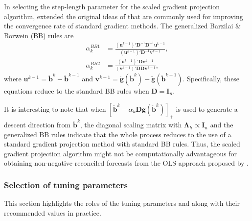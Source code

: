 \documentclass[11pt]{article}
\newcommand{\0}{\phantom{0}}
\begin{document}
In selecting the step-length parameter for the scaled gradient projection algorithm, \citet{Bonettini2009} extended the original ideas of \citet{Barzilai1988} that are commonly used for improving the convergence rate of standard gradient methods. The generalized Barzilai \& Borwein (BB) rules are
\begin{align*}
\alpha_{k}^{BB1} & = \frac{(\bm{u}^{k-1})'\bm{D}^{-1} \bm{D}^{-1} \bm{u}^{k-1}}{(\bm{u}^{k-1})'\bm{D}^{-1}\bm{v}^{k-1}},\\
\alpha_{k}^{BB2} & = \frac{(\bm{u}^{k-1})'\bm{D}\bm{v}^{k-1}}{(\bm{v}^{k-1})'\bm{D}\bm{D}\bm{v}^{k-1}},
\end{align*}
where $\bm{u}^{k-1} = \ddot{\bm{b}}^{k} - \ddot{\bm{b}}^{k-1}$ and $\bm{v}^{k-1} = \ddot{\bm{g}}(\ddot{\bm{b}}^{k}) - \ddot{\bm{g}}(\ddot{\bm{b}}^{k-1})$. Specifically, these equations reduce to the standard BB rules when $\bm{D} = \bm{I}_{n}$.

It is interesting to note that when $[\ddot{\bm{b}}^{k} - \alpha_{k} \bm{D} \ddot{\bm{g}}(\ddot{\bm{b}}^{k})]_{+}$ is used to generate a descent direction from $\ddot{\bm{b}}^{k}$, the diagonal scaling matrix with $\bm{\Lambda}_{h} \propto \bm{I}_{n}$ and the generalized BB rules indicate that the whole process reduces to the use of a standard gradient projection method with standard BB rules. Thus, the scaled gradient projection algorithm might not be computationally advantageous for obtaining non-negative reconciled forecasts from the OLS approach proposed by \citet{Hyndman2011}. 

\subsubsection*{Selection of tuning parameters}

This section highlights the roles of the tuning parameters and along with their recommended values in practice.
\end{document}
